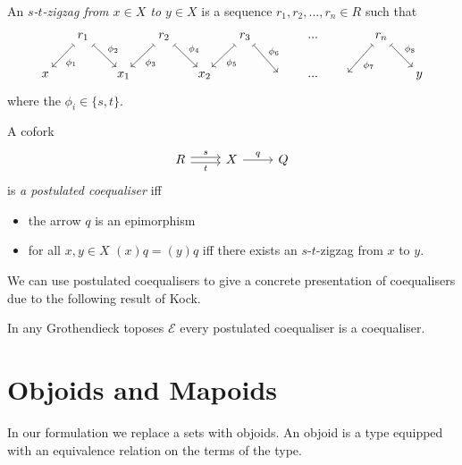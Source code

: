 \documentclass{article}
\begin{document}
\begin{definition}\label{def:zigzag}
  An \emph{$s$-$t$-zigzag from $x\in X$ to $y\in X$} is a sequence $r_1,r_2,...,r_n\in R$ such that
  \begin{equation*}
    \begin{tikzcd}[column sep=0.5cm]
      {} & r_1 \dlar[mapsto]{\phi_1} \drar[mapsto]{\phi_2} & {} & r_2 \dlar[mapsto]{\phi_3} \drar[mapsto]{\phi_4}& {} & r_3 \dlar[mapsto]{\phi_5}\drar[mapsto]{\phi_6} &{} &...& & r_n \dlar[mapsto]{\phi_7}\drar[mapsto]{\phi_8} &{} \\
      x & {} & x_1 & {} & x_2 & {} & {} & ...& {}  & {} & y
    \end{tikzcd}
  \end{equation*}
  where the $\phi_i\in\{s,t\}$.
\end{definition}  

\begin{definition}\label{def:postulated-coequaliser}
  A cofork
  \begin{equation*}
    \begin{tikzcd}
     R \rar[yshift=0.5ex]{s} \rar[yshift=-0.5ex][swap]{t} & X \rar{q} & Q
    \end{tikzcd}
  \end{equation*}
  is \emph{a postulated coequaliser} iff
  \begin{itemize}
  \item the arrow $q$ is an epimorphism
  \item for all $x,y\in X$ $(x)q=(y)q$ iff there exists an $s$-$t$-zigzag from $x$ to $y$.
  \end{itemize}
\end{definition}

We can use postulated coequalisers to give a concrete presentation of coequalisers due to the following result of Kock.

\begin{proposition}\label{prop:postulated-colimits-are-colimits}
  In any Grothendieck toposes $\mathcal E$ every postulated coequaliser is a coequaliser.
\end{proposition}

\section{Objoids and Mapoids}
\label{sec:objoids-mapoids}

In our formulation we replace a sets with objoids.
An objoid is a type equipped with an equivalence relation on the terms of the type.
\end{document}
